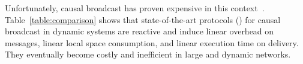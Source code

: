 Unfortunately, causal broadcast has proven expensive in this
context~\cite{charronbost1991concerning}. Table~\ref{table:comparison} shows
that state-of-the-art protocols (\REF) for causal broadcast in dynamic systems
are reactive and induce linear overhead on messages, linear local space
consumption, and linear execution time on delivery. They eventually become
costly and inefficient in large and dynamic networks.



